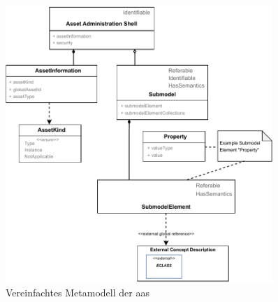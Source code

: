 

\newpage
\begin{figure}[htbp]
    \centering
    \includegraphics[width=0.9\textwidth]{Bilder/Metamodell_neu.drawio.pdf}
    \caption{Vereinfachtes Metamodell der \acs{aas}}
    \label{fig:MetamodellAAS}
\end{figure}

